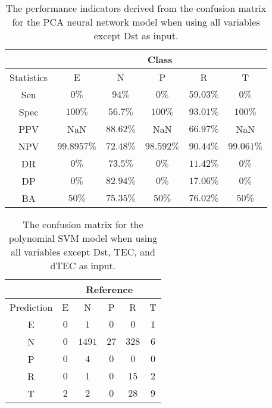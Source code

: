 \begin{table}[!ht]
	\centering
	\begin{tabular}{|c|c|c|c|c|c|}
		\hline
		 & \multicolumn{5}{c|}{Class} \\ \hline
		Statistics & E & N & P & R & T \\ \hline
		Sen & $0\%$ & $94\%$ & $0\%$ & $59.03\%$ & $0\%$ \\ \hline
		Spec & $100\%$ & $56.7\%$ & $100\%$ & $93.01\%$ & $100\%$ \\ \hline
		PPV & NaN & $88.62\%$ & NaN & $66.97\%$ & NaN \\ \hline
		NPV & $99.8957\%$ & $72.48\%$ & $98.592\%$ & $90.44\%$ & $99.061\%$ \\ \hline
		DR & $0\%$ & $73.5\%$ & $0\%$ & $11.42\%$ & $0\%$ \\ \hline
		DP & $0\%$ & $82.94\%$ & $0\%$ & $17.06\%$ & $0\%$ \\ \hline
		BA & $50\%$ & $75.35\%$ & $50\%$ & $76.02\%$ & $50\%$ \\ \hline
	\end{tabular}
	\caption{The performance indicators derived from the confusion matrix for the PCA neural network model when using all variables except Dst as input.}
	\label{tab:cs:reverse:noDst:pcaNNet}
\end{table}

\begin{table}[!ht]
	\centering
	\begin{tabular}{|c|c|c|c|c|c|}
		\hline
		 & \multicolumn{5}{|c|}{Reference} \\ \hline
		 Prediction & E & N & P & R & T \\ \hline
		 E & $0$ & $1$ & $0$ & $0$ & $1$ \\ \hline
		 N & $0$ & $1491$ & $27$ & $328$ & $6$ \\ \hline
		 P & $0$ & $4$ & $0$ & $0$ & $0$ \\ \hline
		 R & $0$ & $1$ & $0$ & $15$ & $2$ \\ \hline
		 T & $2$ & $2$ & $0$ & $28$ & $9$ \\ \hline
	\end{tabular}
	\caption{The confusion matrix for the polynomial SVM model when using all variables except Dst, TEC, and dTEC as input.}
	\label{tab:cm:noTEC:svmPoly}
\end{table}

